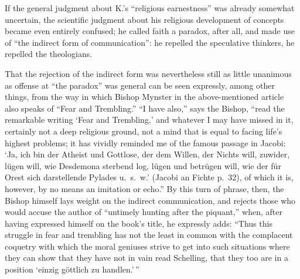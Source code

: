 \documentclass[12pt,a4paper]{article}
\newcommand{\opage}[1]{\marginnote{\footnotesize\textit{[#1]}}}
\begin{document}
If the general judgment about K.'s ``religious earnestness''
was already somewhat uncertain, the scientific judgment
about his religious development of concepts became even entirely confused;
he called faith a paradox, after all, and made use
of ``the indirect form of communication'': he repelled the
speculative thinkers, he repelled the theologians.

That the rejection of the indirect form was nevertheless still
as little unanimous as offense at ``the paradox''
was general can be seen expressly, among other things, from
the way in which Bishop Mynster in the above-mentioned article
also speaks of ``Fear and Trembling.'' ``I have also,''
says the Bishop, ``read the remarkable writing `Fear and
Trembling,' and whatever I may have missed in it,
certainly not a deep religious ground, not a mind that
is equal to facing life's highest problems;
it has vividly reminded me of the famous passage
in Jacobi: `Ja, ich bin der Atheist und Gottlose, der
dem Willen, der Nichts will, zuwider, lügen will, wie Desdemona
sterbend log, lügen und betrügen will, wie der
für Orest sich darstellende Pylades u.\ s.\ w.' (Jacobi an
Fichte p.\ 32), of which it is, however, by no means an imitation
or echo.'' By this turn of phrase, then,
the Bishop himself lays weight on the indirect communication,
and rejects those who would accuse the author of ``untimely
hunting after the piquant,'' when, after having
expressed himself on the book's title, he expressly adds:
``Thus this struggle in fear and trembling has not
the least in common with the complacent coquetry with
which the moral geniuses strive to get into such
situations where they can show that they have not in vain
\opage{7}
read Schelling, that they too are in a position `einzig göttlich
zu handlen.'\,''
\end{document}

